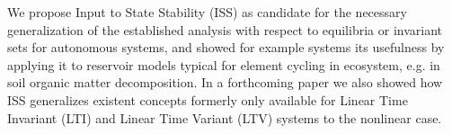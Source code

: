 
\noindent
We propose Input to State Stability (ISS) as
candidate for the necessary generalization of the established analysis with
respect to equilibria or invariant sets for autonomous systems, and showed for example systems its
usefulness by applying it to reservoir models typical for element cycling in
ecosystem, e.g. in soil organic matter decomposition.  In a forthcoming paper we  also showed how ISS
generalizes existent concepts formerly only available for Linear Time Invariant
(LTI) and Linear Time Variant (LTV) systems to the nonlinear case. 
